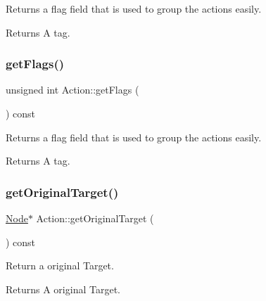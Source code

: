 Returns a flag field that is used to group the actions easily.

\begin{DoxyReturn}{Returns}
A tag. 
\end{DoxyReturn}
\mbox{\label{classAction_aabe5706c0cc66d461b14558728dccf01}} 
\subsubsection{\texorpdfstring{get\+Flags()}{getFlags()}\hspace{0.1cm}{\footnotesize\ttfamily [2/2]}}
{\footnotesize\ttfamily unsigned int Action\+::get\+Flags (\begin{DoxyParamCaption}{ }\end{DoxyParamCaption}) const\hspace{0.3cm}{\ttfamily [inline]}}

Returns a flag field that is used to group the actions easily.

\begin{DoxyReturn}{Returns}
A tag. 
\end{DoxyReturn}
\mbox{\label{classAction_a50cdb52f323c6756ec300e4d0f86596a}} 
\subsubsection{\texorpdfstring{get\+Original\+Target()}{getOriginalTarget()}\hspace{0.1cm}{\footnotesize\ttfamily [1/2]}}
{\footnotesize\ttfamily \hyperlink{classNode}{Node}$\ast$ Action\+::get\+Original\+Target (\begin{DoxyParamCaption}{ }\end{DoxyParamCaption}) const\hspace{0.3cm}{\ttfamily [inline]}}

Return a original Target.

\begin{DoxyReturn}{Returns}
A original Target. 
\end{DoxyReturn}
\mbox{\label{classAction_a50cdb52f323c6756ec300e4d0f86596a}} 
